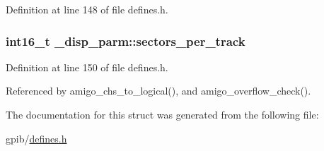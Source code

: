 Definition at line 148 of file defines.\+h.

\subsubsection[{\texorpdfstring{sectors\+\_\+per\+\_\+track}{sectors_per_track}}]{\setlength{\rightskip}{0pt plus 5cm}int16\+\_\+t \+\_\+disp\+\_\+parm\+::sectors\+\_\+per\+\_\+track}\hypertarget{struct__disp__parm_a870887d0582245d0c35f34724180463c}{}\label{struct__disp__parm_a870887d0582245d0c35f34724180463c}


Definition at line 150 of file defines.\+h.



Referenced by amigo\+\_\+chs\+\_\+to\+\_\+logical(), and amigo\+\_\+overflow\+\_\+check().



The documentation for this struct was generated from the following file\+:\begin{DoxyCompactItemize}
\item 
gpib/\hyperlink{defines_8h}{defines.\+h}\end{DoxyCompactItemize}

